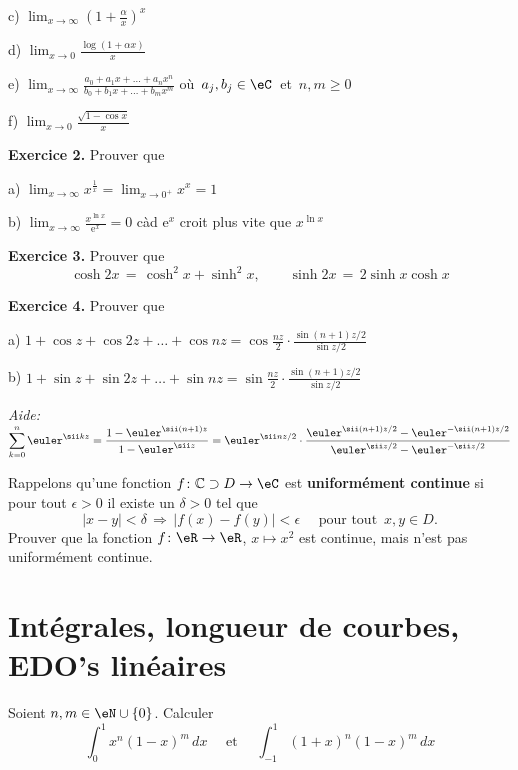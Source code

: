\medskip
c) $\displaystyle \lim_{x \to \infty} 
    \left( 1+ \frac \alpha x \right)^x$

\medskip
d) 
$\displaystyle \lim_{x \to 0} \frac{\log \left( 1+ \alpha x \right)}{x}$


\medskip
e) 
$\displaystyle \lim_{x \to \infty} 
\frac{a_0+a_1x + \dots +a_nx^n}{b_0+b_1x + \dots +b_mx^m}$
\quad où\, $a_j, b_j \in \eC$ \,et\, $n,m \ge 0$

\medskip
f) 
$\displaystyle \lim_{x \to 0} \frac{\sqrt{1-\cos x}}{x}$  




{\bf Exercice 2.} Prouver que

\medskip
a)
$\displaystyle \lim_{x \to \infty} x^{\frac 1x} = \lim_{x \to 0^+} x^x = 1$

\medskip
b)
$\displaystyle \lim_{x \to \infty} \frac{x^{\ln x}}{{\mathrm e}^x} =0$
\quad
càd ${\mathrm e}^x$ croit plus vite que $x^{\ln x}$


{\bf Exercice 3.} Prouver que
$$
\cosh 2x \,=\, \cosh^2 x + \sinh^2 x,
\qquad
\sinh 2x \,=\, 2 \sinh x \cosh x
$$


{\bf Exercice 4.} Prouver que

a)
$1 + \cos z + \cos 2z + \dots + \cos nz = \displaystyle \cos \frac{nz}{2} \cdot \frac{\sin (n+1)z/2}{\sin z/2}$

b)
$1 + \sin z + \sin 2z + \dots + \sin nz = \displaystyle \sin \frac{nz}{2} \cdot \frac{\sin (n+1)z/2}{\sin z/2}$

{\it Aide:}\;
$\displaystyle \sum_{k=0}^n 
\euler^{\sii kz} 
= 
\frac{1-\euler^{\sii (n+1)z}}{1-\euler^{\sii z}}
= \euler^{\sii nz/2} \cdot \frac{\euler^{\sii (n+1)z/2} - \euler^{-\sii (n+1)z/2}}{
\euler^{\sii z/2}-\euler^{-\sii z/2}}
$

Rappelons qu'une fonction $f \colon \mathbb{C} \supset D \to \eC$ est {\bf uniformément continue} si pour tout $\epsilon >0$ il existe un \( \delta>0\) tel que 
$$
|x-y| < \delta \,\Longrightarrow\, |f(x)-f(y)| < \epsilon 
\quad \text{ pour tout }\, x,y \in D.
$$
Prouver que la fonction $f \colon \eR \to \eR$, $x \mapsto x^2$ est continue, mais n'est pas uniformément continue.


\section{Intégrales, longueur de courbes, EDO's linéaires}


\exerNico 
Soient $n,m \in \eN \cup \{0\}$.
Calculer
$$
\int_0^1 x^n (1-x)^m \,dx
\quad \text{ et } \quad
\int_{-1}^1 (1+x)^n (1-x)^m \,dx
$$

